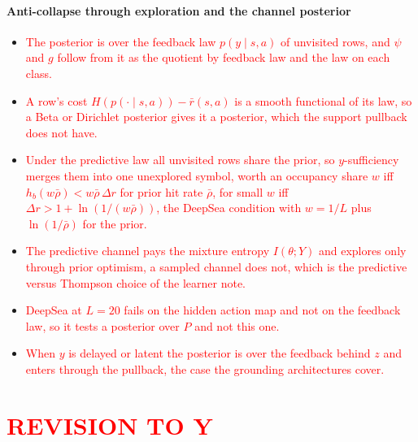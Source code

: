 \documentclass[10pt]{article}
\newcommand{\add}[1]{\textcolor{red}{#1}}
\begin{document}
\paragraph{Anti-collapse through exploration and the channel posterior}
\begin{itemize}

  \item \add{The posterior is over the feedback law $p(y \mid s,a)$ of unvisited rows, and $\psi$ and $g$ follow from it as the quotient by feedback law and the law on each class.}
  \item \add{A row's cost $H(p(\cdot \mid s,a)) - \bar r(s,a)$ is a smooth functional of its law, so a Beta or Dirichlet posterior gives it a posterior, which the support pullback does not have.}
  \item \add{Under the predictive law all unvisited rows share the prior, so $y$-sufficiency merges them into one unexplored symbol, worth an occupancy share $w$ iff $h_b(w\bar\rho) < w\bar\rho\,\Delta r$ for prior hit rate $\bar\rho$, for small $w$ iff $\Delta r > 1 + \ln(1/(w\bar\rho))$, the DeepSea condition with $w = 1/L$ plus $\ln(1/\bar\rho)$ for the prior.}
  \item \add{The predictive channel pays the mixture entropy $I(\theta;Y)$ and explores only through prior optimism, a sampled channel does not, which is the predictive versus Thompson choice of the learner note.}
  \item \add{DeepSea at $L = 20$ fails on the hidden action map and not on the feedback law, so it tests a posterior over $P$ and not this one.}
  \item \add{When $y$ is delayed or latent the posterior is over the feedback behind $z$ and enters through the pullback, the case the grounding architectures cover.}
\end{itemize}







\section{\add{REVISION TO Y}}
\end{document}
